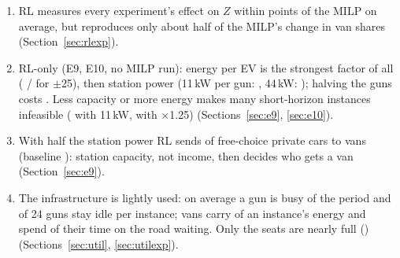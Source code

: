 \begin{keybox}
\begin{enumerate}[leftmargin=1.4em,itemsep=1pt]
  \item RL measures every experiment's effect on $Z$ within \EffDiffRtMean{} points of the MILP on average, but reproduces only about half of the MILP's change in van shares (Section~\ref{sec:rlexp}).
  \item RL-only (E9, E10, no MILP run): energy per EV is the strongest factor of all (\dZEtenDemLoRt\pct{} / \dZEtenDemHiRt\pct{} for $\pm$25\pct), then station power (11\,kW per gun: \dZEninePowLoRt\pct, 44\,kW: \dZEninePowHiRt\pct); halving the guns costs \dZEnineGunsLoRt\pct. Less capacity or more energy makes many short-horizon instances infeasible (\LostEninePowLoRt{} with 11\,kW, \LostEtenDemHiRt{} with $\times$1.25) (Sections~\ref{sec:e9}, \ref{sec:e10}).
  \item With half the station power RL sends \VanPEninePowLoRt\pct{} of free-choice private cars to vans (baseline \VanPBEninePowLoRt\pct): station capacity, not income, then decides who gets a van (Section~\ref{sec:e9}).
  \item The infrastructure is lightly used: on average a gun is busy \UGunMilp\pct{} of the period and \UIdleGunsMilp{} of 24 guns stay idle per instance; vans carry \UVanEnergyMilp\pct{} of an instance's energy and spend \UIdleVanMilp\pct{} of their time on the road waiting. Only the seats are nearly full (\USeatMilp\pct) (Sections~\ref{sec:util}, \ref{sec:utilexp}).
\end{enumerate}
\end{keybox}

\tableofcontents
\clearpage


